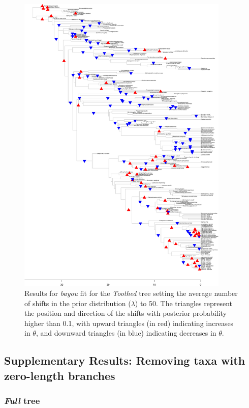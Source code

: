\begin{figure}[H]
\includegraphics[width=0.9\textwidth]{img/plots-toothed-wZBL-k50-1.pdf}
\caption{Results for \textit{bayou} fit for the \textit{Toothed} tree setting the average number of shifts in the prior distribution ($\lambda$) to 50. The triangles represent the position and direction of the shifts with posterior probability higher than 0.1, with upward triangles (in red) indicating increases in $\theta$, and downward triangles (in blue) indicating decreases in $\theta$.}
\label{fig:toothed-k50}
\end{figure}

\subsection{Supplementary Results: Removing taxa with zero-length branches}
\subsubsection{\textit{Full} tree}

